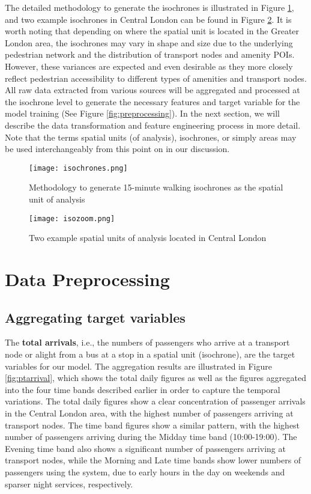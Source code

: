The detailed methodology to generate the isochrones is illustrated in Figure \ref{fig:isochrones}, and two example isochrones in Central London can be found in Figure \ref{fig:isozoom}. It is worth noting that depending on where the spatial unit is located in the Greater London area, the isochrones may vary in shape and size due to the underlying pedestrian network and the distribution of transport nodes and amenity POIs. However, these variances are expected and even desirable as they more closely reflect pedestrian accessibility to different types of amenities and transport nodes. All raw data extracted from various sources will be aggregated and processed at the isochrone level to generate the necessary features and target variable for the model training (See Figure \ref{fig:preprocessing}). In the next section, we will describe the data transformation and feature engineering process in more detail. Note that the terms spatial units (of analysis), isochrones, or simply areas may be used interchangeably from this point on in our discussion.

\begin{figure}[ht]
    \centering
    \texttt{[image: isochrones.png]}
    \captionsetup{justification=centering}
    \caption{Methodology to generate 15-minute walking isochrones as the spatial unit of analysis}
    \label{fig:isochrones}
\end{figure}

\begin{figure}[!ht]
    \centering
    \texttt{[image: isozoom.png]}
    \caption{Two example spatial units of analysis located in Central London}
    \label{fig:isozoom}
\end{figure}




\pagebreak[4] %
\section{Data Preprocessing}
\subsection{Aggregating target variables}

The \textbf{total arrivals}, i.e., the numbers of passengers who arrive at a transport node or alight from a bus at a stop in a spatial unit (isochrone), are the target variables for our model. The aggregation results are illustrated in Figure \ref{fig:ptarrival}, which shows the total daily figures as well as the figures aggregated into the four time bands described earlier in order to capture the temporal variations. The total daily figures show a clear concentration of passenger arrivals in the Central London area, with the highest number of passengers arriving at transport nodes. The time band figures show a similar pattern, with the highest number of passengers arriving during the Midday time band (10:00-19:00). The Evening time band also shows a significant number of passengers arriving at transport nodes, while the Morning and Late time bands show lower numbers of passengers using the system, due to early hours in the day on weekends and sparser night services, respectively. 

